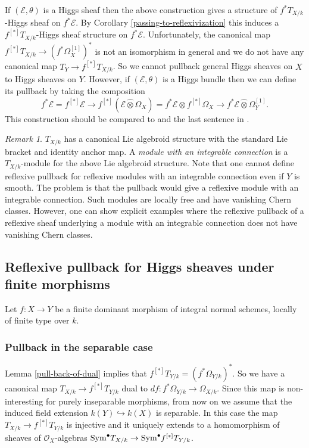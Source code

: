 \documentclass[12pt]{article}
\theoremstyle{plain}
\theoremstyle{definition}
\theoremstyle{remark}
\newtheorem{Remark}[Thm]{Remark}
\newcommand{\cE}{{\mathcal E}}
\newcommand{\cO}{{\mathcal O}}
\newcommand{\Sym}{{\mathop{{\rm Sym}}}}
\begin{document}
If $(\cE,\theta)$ is a Higgs sheaf then the above construction gives a structure of 
$f^{*}T_{X/k}$-Higgs sheaf on $f^*\cE$.  By Corollary \ref{passing-to-reflexivization} this induces a $f^{[*]}T_{X/k}$-Higgs sheaf structure  on $f^*\cE$. Unfortunately, the canonical map $f^{[*]}T_{X/k}\to ( f^*\Omega_X^{[1]})^*$ is not an isomorphism in general and we do not have any canonical map  $T_Y\to f^{[*]}T_{X/k}$. So we cannot pullback general Higgs sheaves on $X$ to Higgs sheaves on $Y$.
However, if  $(\cE,\theta)$  is a  Higgs bundle then we can define its pullback by taking
the composition
$$f^{*}\cE=f^{[*]}\cE\to f^{[*]}(\cE\hat \otimes \Omega_X)=  f^{*}\cE\otimes f^{[*]}\Omega_X\to f^{*}\cE\hat\otimes \Omega_Y^{[1]}.$$
This construction should be compared to \cite[5.3]{GKPT2} and the last sentence in \cite[5.2]{GKPT2}.

\begin{Remark}
 $T_{X/k}$ has a canonical Lie algebroid structure with the standard Lie bracket and identity anchor map.
A \emph{module with an integrable connection} is a $T_{X/k}$-module for the above Lie algebroid structure.
Note that one cannot define reflexive pullback for reflexive modules with an integrable connection even if $Y$ is smooth. The problem is that the pullback would give a reflexive module with an integrable connection.
Such modules are locally free and have vanishing Chern classes. However, one can show explicit examples where the reflexive pullback of a reflexive sheaf underlying a module with an integrable connection does not have vanishing Chern classes. 
\end{Remark}


\subsection{Reflexive pullback for Higgs sheaves under finite morphisms}

Let $f: X\to Y$ be a finite dominant morphism of integral normal schemes, locally of finite type over $k$.

\medskip

\subsubsection{Pullback in the separable case}

Lemma \ref{pull-back-of-dual}
implies that $f^{[*]}T_{Y/k}=(f^*\Omega_{Y/k})^*$. So
we have a canonical map $T_{X/k}\to f^{[*]}T_{Y/k}$ dual to $df: f^*\Omega_{Y/k}\to \Omega_{X/k}.$
Since this map is non-interesting for purely inseparable morphisms, from now on 
we assume that the induced field extension $ k(Y)\hookrightarrow k(X)$ is separable.
In this case the map $T_{X/k}\to f^{[*]}T_{Y/k}$ is injective and it uniquely extends to a homomorphism of sheaves of $\cO_X$-algebras   $\Sym^{\bullet}T_{X/k}\to \Sym^{\bullet} f^{[*]}T_{Y/k}$.
\end{document}
